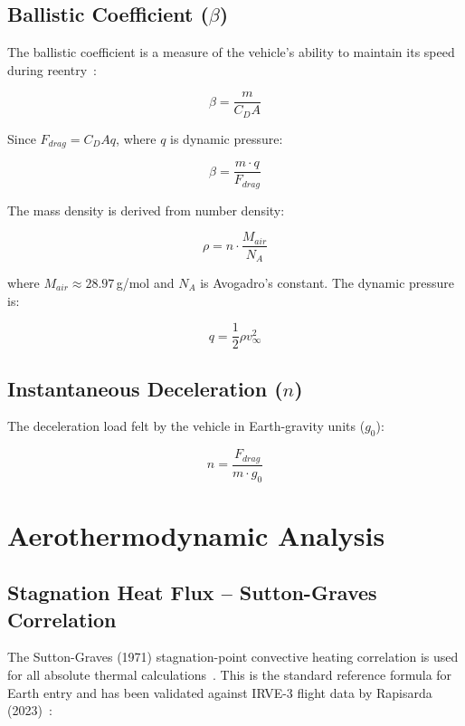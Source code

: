 \subsection{Ballistic Coefficient (\texorpdfstring{$\beta$}{beta})}
\label{sec:ballistic}
The ballistic coefficient is a measure of the vehicle's ability to maintain its speed during reentry~\cite{anderson2006hypersonic}:

\begin{equation}
    \beta = \frac{m}{C_D A}
\end{equation}

Since $F_{drag} = C_D A q$, where $q$ is dynamic pressure:

\begin{equation}
    \beta = \frac{m \cdot q}{F_{drag}}
\end{equation}

The mass density is derived from number density:

\begin{equation}
    \rho = n \cdot \frac{M_{air}}{N_A}
\end{equation}

where $M_{air} \approx 28.97$\,g/mol and $N_A$ is Avogadro's constant. The dynamic pressure is:

\begin{equation}
    q = \frac{1}{2} \rho v_{\infty}^2
\end{equation}

\subsection{Instantaneous Deceleration (\texorpdfstring{$n$}{n})}
The deceleration load felt by the vehicle in Earth-gravity units ($g_0$):

\begin{equation}
    n = \frac{F_{drag}}{m \cdot g_0}
\end{equation}

\section{Aerothermodynamic Analysis}

\subsection{Stagnation Heat Flux -- Sutton-Graves Correlation}
The Sutton-Graves (1971) stagnation-point convective heating correlation is used for all absolute thermal calculations~\cite{sutton1971gravesh}. This is the standard reference formula for Earth entry and has been validated against IRVE-3 flight data by Rapisarda (2023)~\cite{rapisarda2023mdao}:

